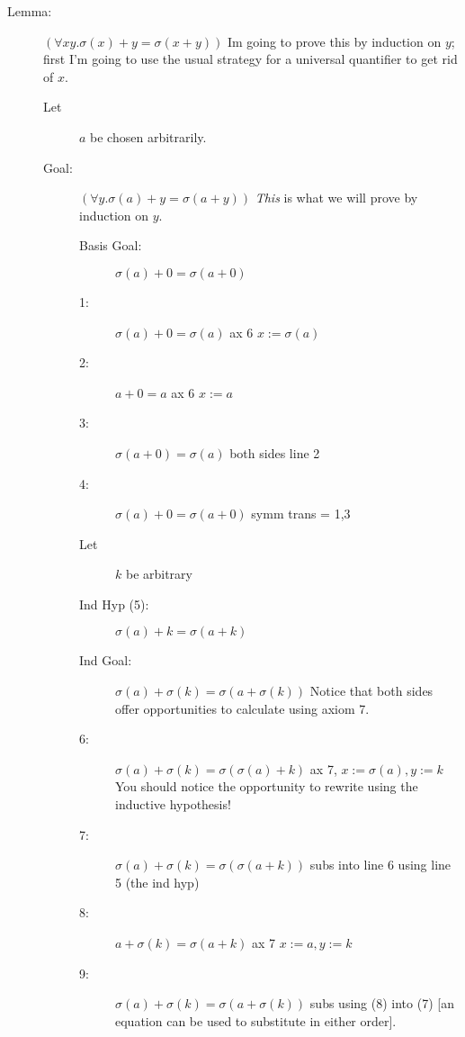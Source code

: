 \documentclass[12pt]{book}
\begin{document}
\begin{description}

\item[Lemma:]  $(\forall xy.\sigma(x)+y=\sigma(x+y))$  Im going to prove this by induction on $y$; first I'm going to use the usual strategy for a universal quantifier to get rid of $x$.

\begin{description}

\item[Let] $a$ be chosen arbitrarily.

\item[Goal:]  $(\forall y.\sigma(a)+y = \sigma(a+y))$  {\em This\/} is what we will prove by induction on $y$.

\begin{description}

\item[Basis Goal:]  $\sigma(a)+0 =\sigma(a+0)$

\item[1:]  $\sigma(a)+0=\sigma(a)$  ax 6 $x:=\sigma(a)$

\item[2:]  $a+0=a$  ax 6 $x:=a$

\item[3:]  $\sigma(a+0)=\sigma(a)$  both sides line 2

\item [4:]  $\sigma(a)+0 =\sigma(a+0)$  symm trans = 1,3

\item[Let] $k$ be arbitrary

\item[Ind Hyp (5):]  $\sigma(a)+k=\sigma(a+k)$

\item[Ind Goal:]  $\sigma(a)+\sigma(k) = \sigma(a+\sigma(k))$  Notice that both sides offer opportunities to calculate using axiom 7.

\item[6:]  $\sigma(a)+\sigma(k) = \sigma(\sigma(a)+k)$  ax 7, $x:=\sigma(a), y:=k$  You should notice the opportunity to rewrite using the inductive hypothesis!

\item[7:]  $\sigma(a)+\sigma(k) = \sigma(\sigma(a+k))$  subs into line 6 using line 5 (the ind hyp)

\item[8:]  $a+\sigma(k)=\sigma(a+k)$  ax 7 $x:=a,y:=k$

\item[9:]  $\sigma(a)+\sigma(k) = \sigma(a+\sigma(k))$  subs using (8) into (7)  [an equation can be used to substitute in either order].

\end{description}


\end{description}

\end{description}
\end{document}
